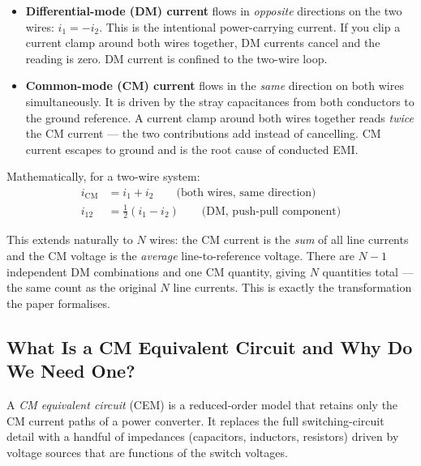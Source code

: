 \begin{circuitbox}
\begin{itemize}
    \item \textbf{Differential-mode (DM) current} flows in
          \emph{opposite} directions on the two wires:
          $i_1 = -i_2$.  This is the intentional power-carrying
          current.  If you clip a current clamp around both wires
          together, DM currents cancel and the reading is zero.
          DM current is confined to the two-wire loop.

    \item \textbf{Common-mode (CM) current} flows in the \emph{same}
          direction on both wires simultaneously.  It is driven by
          the stray capacitances from both conductors to the ground
          reference.  A current clamp around both wires together
          reads \emph{twice} the CM current — the two contributions
          add instead of cancelling.  CM current escapes to ground
          and is the root cause of conducted EMI.
\end{itemize}
\end{circuitbox}

Mathematically, for a two-wire system:
\begin{align}
    i_{\mathrm{CM}} &= i_1 + i_2
        \qquad \text{(both wires, same direction)} \\
    i_{12}          &= \tfrac{1}{2}(i_1 - i_2)
        \qquad \text{(DM, push-pull component)}
\end{align}

This extends naturally to $N$ wires: the CM current is the \emph{sum}
of all line currents and the CM voltage is the \emph{average}
line-to-reference voltage.  There are $N-1$ independent DM
combinations and one CM quantity, giving $N$ quantities total — the
same count as the original $N$ line currents.  This is exactly the
transformation the paper formalises.

\subsection{What Is a CM Equivalent Circuit and Why Do We Need One?}

A \emph{CM equivalent circuit} (CEM) is a reduced-order model that
retains only the CM current paths of a power converter.  It replaces
the full switching-circuit detail with a handful of impedances
(capacitors, inductors, resistors) driven by voltage sources that
are functions of the switch voltages.

